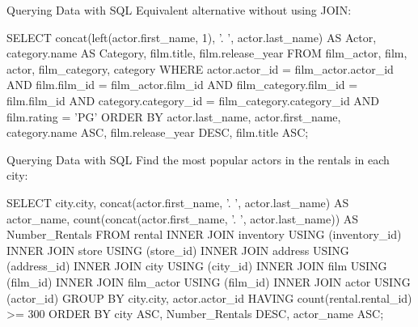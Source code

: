 \documentclass[ignorenonframetext,xcolor=x11names]{beamer}
\begin{document}
\begin{frame}[fragile]{Querying Data with SQL}
Equivalent alternative without using JOIN:
\footnotesize
\begin{sqlcode}
SELECT concat(left(actor.first_name, 1), 
              '. ', actor.last_name) AS Actor, 
       category.name AS Category, 
       film.title, 
       film.release_year
  FROM film_actor, film, actor, film_category, category
  WHERE actor.actor_id = film_actor.actor_id AND
        film.film_id = film_actor.film_id AND
        film_category.film_id = film.film_id AND
        category.category_id = film_category.category_id AND
        film.rating = 'PG'
  ORDER BY actor.last_name, 
           actor.first_name, 
           category.name ASC, 
           film.release_year DESC, 
           film.title ASC;
\end{sqlcode}
\end{frame}

\begin{frame}[fragile]{Querying Data with SQL}
Find the most popular actors in the rentals in each city:
\footnotesize
\begin{sqlcode}
SELECT city.city, 
       concat(actor.first_name, '. ', 
           actor.last_name) AS actor_name,
       count(concat(actor.first_name, '. ', 
           actor.last_name)) AS Number_Rentals
  FROM rental
  INNER JOIN inventory USING (inventory_id)
  INNER JOIN store USING (store_id)
  INNER JOIN address USING (address_id)
  INNER JOIN city USING (city_id)
  INNER JOIN film USING (film_id)
  INNER JOIN film_actor USING (film_id)
  INNER JOIN actor USING (actor_id)
  GROUP BY city.city, actor.actor_id
  HAVING count(rental.rental_id) >= 300
  ORDER BY city ASC, 
           Number_Rentals DESC, 
           actor_name ASC;
\end{sqlcode}
\end{frame}
\end{document}
